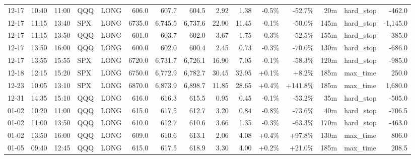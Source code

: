 \documentclass[11pt,a4paper,twoside]{article}
\begin{document}
\begin{landscape}
\begin{center}
\begin{longtable}{>{\color{txtmain}}l l l l l r r r r r r r r >{\color{txtmain}}l r}
12-17 & 10:40 & 11:00 & QQQ & LONG & 606.0 & 607.7 & 604.5 & 2.92 & 1.38 & \textcolor{lossred}{-0.5\%} & \textcolor{lossred}{-52.7\%} & 20m & hard\_stop & \textcolor{lossred}{-462.0} \\
12-17 & 11:15 & 13:40 & SPX & LONG & 6735.0 & 6,745.5 & 6,737.6 & 22.90 & 11.45 & \textcolor{lossred}{-0.1\%} & \textcolor{lossred}{-50.0\%} & 145m & hard\_stop & \textcolor{lossred}{-1,145.0} \\
12-17 & 11:15 & 13:50 & QQQ & LONG & 601.0 & 603.7 & 602.0 & 3.67 & 1.75 & \textcolor{lossred}{-0.3\%} & \textcolor{lossred}{-52.5\%} & 155m & hard\_stop & \textcolor{lossred}{-385.0} \\
12-17 & 13:50 & 16:00 & QQQ & LONG & 600.0 & 602.0 & 600.4 & 2.45 & 0.73 & \textcolor{lossred}{-0.3\%} & \textcolor{lossred}{-70.0\%} & 130m & hard\_stop & \textcolor{lossred}{-686.0} \\
12-17 & 13:55 & 15:55 & SPX & LONG & 6720.0 & 6,731.7 & 6,726.1 & 16.90 & 7.05 & \textcolor{lossred}{-0.1\%} & \textcolor{lossred}{-58.3\%} & 120m & hard\_stop & \textcolor{lossred}{-985.0} \\
12-18 & 12:15 & 15:20 & SPX & LONG & 6750.0 & 6,772.9 & 6,782.7 & 30.45 & 32.95 & \textcolor{wingreen}{+0.1\%} & \textcolor{wingreen}{+8.2\%} & 185m & max\_time & \textcolor{wingreen}{250.0} \\
12-23 & 10:05 & 13:10 & SPX & LONG & 6870.0 & 6,873.9 & 6,898.7 & 11.85 & 28.65 & \textcolor{wingreen}{+0.4\%} & \textcolor{wingreen}{+141.8\%} & 185m & max\_time & \textcolor{wingreen}{1,680.0} \\
12-31 & 14:35 & 15:10 & QQQ & LONG & 616.0 & 616.3 & 615.5 & 0.95 & 0.45 & \textcolor{lossred}{-0.1\%} & \textcolor{lossred}{-53.2\%} & 35m & hard\_stop & \textcolor{lossred}{-505.0} \\
01-02 & 10:20 & 11:00 & QQQ & LONG & 615.0 & 617.5 & 612.7 & 3.20 & 0.84 & \textcolor{lossred}{-0.8\%} & \textcolor{lossred}{-73.6\%} & 40m & hard\_stop & \textcolor{lossred}{-706.5} \\
01-02 & 11:00 & 13:50 & QQQ & LONG & 610.0 & 612.7 & 610.6 & 3.66 & 1.35 & \textcolor{lossred}{-0.3\%} & \textcolor{lossred}{-63.3\%} & 170m & hard\_stop & \textcolor{lossred}{-463.0} \\
01-02 & 13:50 & 16:00 & QQQ & LONG & 609.0 & 610.6 & 613.1 & 2.06 & 4.08 & \textcolor{wingreen}{+0.4\%} & \textcolor{wingreen}{+97.8\%} & 130m & max\_time & \textcolor{wingreen}{806.0} \\
01-05 & 09:40 & 12:45 & QQQ & LONG & 615.0 & 617.5 & 618.9 & 3.30 & 4.00 & \textcolor{wingreen}{+0.2\%} & \textcolor{wingreen}{+21.0\%} & 185m & max\_time & \textcolor{wingreen}{208.5} \\

\end{longtable}
\end{center}
\end{landscape}
\end{document}
